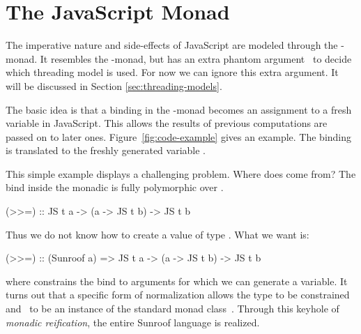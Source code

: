  
\section{The JavaScript Monad}
\label{sec:js-monad}

The imperative nature and side-effects of JavaScript are 
modeled through the \JS-monad. It resembles the \IO-monad, 
but has an extra phantom argument~\cite{Leijen:99:Phantom} 
to decide which threading model is used. 
For now we can ignore this extra argument. It will be
discussed in Section \ref{sec:threading-models}.

The basic idea is that a binding in the \JS-monad becomes an
assignment to a fresh variable in JavaScript. 
This allows the results of previous computations are passed on to 
later ones.
Figure~\ref{fig:code-example} gives an example.
The binding  is translated to the freshly generated
variable .

This simple example displays a challenging problem. Where does
 come from? The bind inside the monadic  is
fully polymorphic over .
\begin{Code}
(>>=) :: JS t a -> (a -> JS t b) -> JS t b
\end{Code}
Thus we do not know how to create a value of type . What we want is:
\begin{Code}
(>>=) :: (Sunroof a) => JS t a -> (a -> JS t b) -> JS t b
\end{Code}
where  constrains the bind to
arguments for which we can generate a variable.
It turns out that a specific form of normalization allows 
the type  to be constrained and \JS~to 
be an instance of the standard monad class~\cite{Sculthorpe:13:ConstrainedMonads}.
Through this keyhole of {\em monadic reification},
the entire Sunroof language is realized. 

